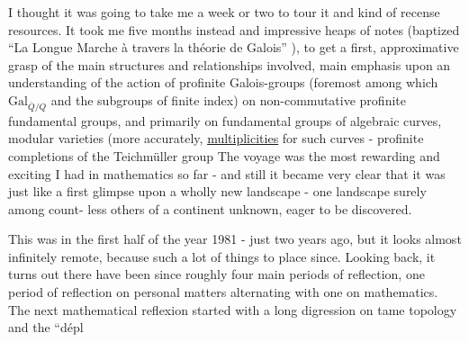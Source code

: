  I thought it was going to take me a week or two to tour it and 
kind of recense resources. It took me five months instead  and  impressive
heaps of notes (baptized  ``La Longue Marche à travers la théorie de
Galois'' ),  to get a  first,  approximative grasp of  the
main structures and relationships involved,  main emphasis  upon \margin{/}
an understanding of the action of profinite Galois-groups (foremost
among which $\mathrm{Gal}_{\overline{Q}/Q}$ and the subgroups of finite index) on non-commutative
profinite fundamental groups,  and primarily on fundamental groups of
algebraic curves, modular varieties (more accurately,  \uline{multiplicities}\hand{)}
for such curves -   profinite completions of the Teichmüller group
The voyage was the most rewarding and exciting I had in mathematics so
far  -  and still it became very clear that it was just like a first
glimpse upon a wholly new landscape - one landscape surely among count-%
less others of a continent unknown,  eager to be discovered.

This was in the first half of the year 1981  -  just two years ago,
 but it looks almost infinitely remote,  because such a lot of things to
place since.  Looking back,  it turns out there have been since roughly
four main  periods of reflection,  one period of reflection on personal
matters alternating with one on mathematics.  The next mathematical
reflexion started with a long digression on tame topology and the ``dépl


